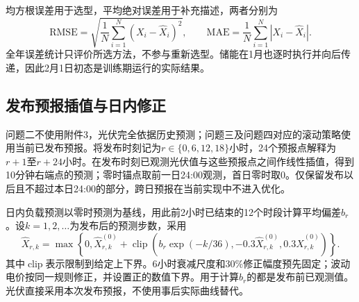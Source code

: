 均方根误差用于选型，平均绝对误差用于补充描述，两者分别为
\begin{equation}
 \mathrm{RMSE}=\sqrt{\frac1N\sum_{i=1}^{N}(X_i-\widehat X_i)^2},
 \qquad \mathrm{MAE}=\frac1N\sum_{i=1}^{N}|X_i-\widehat X_i|.
\end{equation}
全年误差统计只评价所选方法，不参与重新选型。储能在1月也逐时执行并向后传递，因此2月1日初态是训练期运行的实际结果。

\subsection{发布预报插值与日内修正}

问题二不使用附件3，光伏完全依据历史预测；问题三及问题四对应的滚动策略使用当前已发布预报。将发布时刻记为$r\in\{0,6,12,18\}$小时，24个预报点解释为$r+1$至$r+24$小时。在发布时刻已观测光伏值与这些预报点之间作线性插值，得到10分钟右端点的预测；零时锚点取前一日24:00观测，首日零时取0。仅保留发布以后且不超过本日24:00的部分，跨日预报在当前实现中不进入优化。

日内负载预测以零时预测为基线，用此前2小时已结束的12个时段计算平均偏差$b_r$。设$k=1,2,\ldots$为发布后的预测步数，采用
\begin{equation}
 \widehat X_{r,k}=\max\!\left\{0,\widehat X^{(0)}_{r,k}
 +\operatorname{clip}\!\left(b_r\exp(-k/36),-0.3\widehat X^{(0)}_{r,k},0.3\widehat X^{(0)}_{r,k}\right)\right\}.
 \label{eq:issue_correction}
\end{equation}
其中$\operatorname{clip}$表示限制到给定上下界。6小时衰减尺度和30\%修正幅度预先固定；波动电价按同一规则修正，并设置正的数值下界。用于计算$b_r$的都是发布前已观测值。光伏直接采用本次发布预报，不使用事后实际曲线替代。
